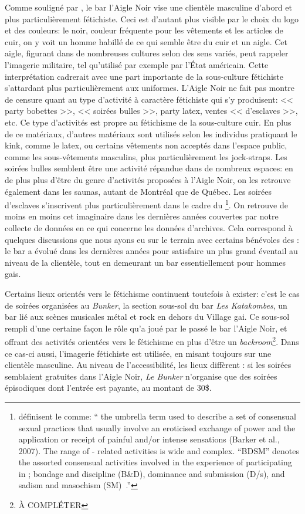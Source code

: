 Comme souligné par \citet{Giraud2013a}, le bar l'Aigle Noir vise une clientèle masculine d'abord et plus particulièrement fétichiste. 
Ceci est d'autant plus visible par le choix du logo et des couleurs: le noir, couleur fréquente pour les vêtements et les articles de cuir, on y voit un homme habillé de ce qui semble être du cuir et un aigle. 
Cet aigle, figurant dans de nombreuses cultures selon des sens variés, peut rappeler l'imagerie militaire, tel qu'utilisé par exemple par l'État américain. 
Cette interprétation cadrerait avec une part importante de la sous-culture fétichiste s'attardant plus particulièrement aux uniformes. 
L'Aigle Noir ne fait pas montre de censure quant au type d'activité à caractère fétichiste qui s'y produisent: << party bobettes >>, << soirées bulles >>, party latex, ventes << d'esclaves >>, etc. 
Ce type d'activités est propre au fétichisme de la sous-culture cuir.
En plus de ce matériaux, d'autres matériaux sont utilisés selon les individus pratiquant le kink, comme le latex, ou certains vêtements non acceptés dans l'espace public, comme les sous-vêtements masculins, plus particulièrement les jock-straps.
Les soirées bulles semblent être une activité répandue dans de nombreux espaces: en de plus plus d'être du genre d'activités proposées à l'Aigle Noir, on les retrouve également dans les saunas, autant de Montréal que de Québec. 
Les soirées d'esclaves s'inscrivent plus particulièrement dans le cadre du \bdsm{}\footnote{\citeauthor{ Turley2015} définisent le \bdsm{} comme: \foreignquote{ english}{\textelp{} the umbrella term used to describe a set of consensual sexual practices that usually involve an eroticised exchange of power and the application or receipt of painful and/or intense sensations (Barker et al., 2007). 
The range of \bdsm{}- related activities is wide and complex. 
“BDSM” denotes the assorted consensual activities involved in the experience of participating in \bdsm{}; bondage and discipline (B\&D), dominance and submission (D/s), and sadism and masochism (SM)~\citeyearpar[24]{Turley2015}.}}. 
On retrouve de moins en moins cet imaginaire dans les dernières années couvertes par notre collecte de données en ce qui concerne les données d'archives. 
Cela correspond à quelques discussions que nous ayons eu sur le terrain avec certains bénévoles des \agq{}: le bar a évolué dans les dernières années pour satisfaire un plus grand éventail au niveau de la clientèle, tout en demeurant un bar essentiellement pour hommes gais. 

Certains lieux orientés vers le fétichisme continuent toutefois à exister: c'est le cas de soirées organisées au \emph{Bunker}, la section sous-sol du bar \emph{Les Katakombes}, un bar lié aux scènes musicales métal et rock en dehors du Village gai. 
Ce sous-sol rempli d'une certaine façon le rôle qu'a joué par le passé le bar l'Aigle Noir, et offrant des activités orientées vers le fétichisme en plus d'être un \emph{backroom}\footnote{À COMPLÉTER}. 
Dans ce cas-ci aussi, l'imagerie fétichiste est utilisée, en misant toujours sur une clientèle masculine. 
Au niveau de l'accessibilité, les lieux diffèrent : si les soirées semblaient gratuites dans l'Aigle Noir, \emph{Le Bunker} n'organise que des soirées épisodiques dont l'entrée est payante, au montant de 30\$. 

